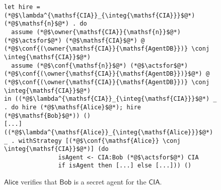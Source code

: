 \begin{figure}
\centering
\begin{lstlisting}
let hire = (*@$\lambda^{\mathsf{CIA}}_{\integ{\mathsf{CIA}}}$@*) (*@$\mathsf{n}$@*) . do
  assume (*@$\owner{\mathsf{CIA}}{\mathsf{n}}$@*) (*@$\actsfor$@*) (*@$\mathsf{CIA}$@*) @ (*@$\conf{(\owner{\mathsf{CIA}}{\mathsf{AgentDB}})} \conj \integ{\mathsf{CIA}}$@*)
  assume (*@$\conf{\mathsf{n}}$@*) (*@$\actsfor$@*) (*@$\conf{(\owner{\mathsf{CIA}}{\mathsf{AgentDB}})}$@*) @ (*@$\conf{(\owner{\mathsf{CIA}}{\mathsf{AgentDB}})} \conj \integ{\mathsf{CIA}}$@*)
in ((*@$\lambda^{\mathsf{CIA}}_{\integ{\mathsf{CIA}}}$@*) _ . do hire (*@$\mathsf{Alice}$@*); hire (*@$\mathsf{Bob}$@*)) ()
[...]
((*@$\lambda^{\mathsf{Alice}}_{\integ{\mathsf{Alice}}}$@*) _ . withStrategy [(*@$\conf{\mathsf{Alice}} \conj \integ{\mathsf{CIA}}$@*)] (do
               isAgent <- CIA:Bob (*@$\actsfor$@*) CIA
               if isAgent then [...] else [...])) ()
\end{lstlisting}
\caption{$\mathsf{Alice}$ verifies that $\mathsf{Bob}$ is a secret agent for the $\mathsf{CIA}$.}
\label{fig:govt-alice-checks-bob}
\end{figure}